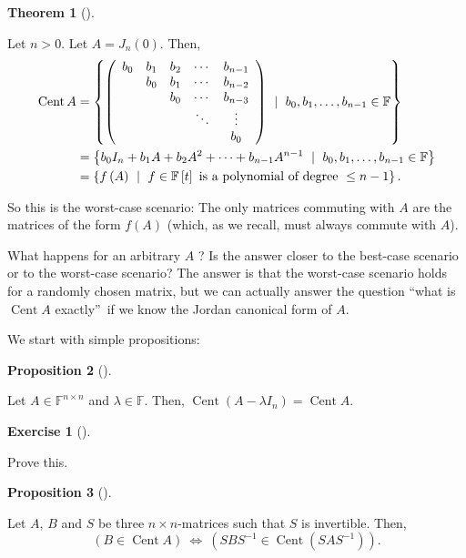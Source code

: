 \documentclass[numbers=enddot,12pt,final,onecolumn,notitlepage]{scrartcl}%
\newcounter{exer}
\numberwithin{exer}{subsection}
\theoremstyle{definition}
\newtheorem{theo}{Theorem}[subsection]
\newenvironment{theorem}[1][]
{\begin{theo}[#1]\begin{leftbar}}
{\end{leftbar}\end{theo}}
\newtheorem{prop}[theo]{Proposition}
\newenvironment{proposition}[1][]
{\begin{prop}[#1]\begin{leftbar}}
{\end{leftbar}\end{prop}}
\newtheorem{exmp}[exer]{Exercise}
\newenvironment{exercise}[1][]
{\begin{exmp}[#1]\begin{leftbar}}
{\end{leftbar}\end{exmp}}
\begin{document}
\begin{theorem}
Let $n>0$. Let $A=J_{n}\left(  0\right)  $. Then,
\begin{align*}
\operatorname*{Cent}A  &  =\left\{  \left(
\begin{array}
[c]{ccccc}%
b_{0} & b_{1} & b_{2} & \cdots & b_{n-1}\\
& b_{0} & b_{1} & \cdots & b_{n-2}\\
&  & b_{0} & \cdots & b_{n-3}\\
&  &  & \ddots & \vdots\\
&  &  &  & b_{0}%
\end{array}
\right)  \ \mid\ b_{0},b_{1},\ldots,b_{n-1}\in\mathbb{F}\right\} \\
&  =\left\{  b_{0}I_{n}+b_{1}A+b_{2}A^{2}+\cdots+b_{n-1}A^{n-1}\ \mid
\ b_{0},b_{1},\ldots,b_{n-1}\in\mathbb{F}\right\} \\
&  =\left\{  f\left(  A\right)  \ \mid\ f\in\mathbb{F}\left[  t\right]  \text{
is a polynomial of degree }\leq n-1\right\}  .
\end{align*}

\end{theorem}

So this is the worst-case scenario: The only matrices commuting with $A$ are
the matrices of the form $f\left(  A\right)  $ (which, as we recall, must
always commute with $A$).

What happens for an arbitrary $A$ ? Is the answer closer to the best-case
scenario or to the worst-case scenario? The answer is that the worst-case
scenario holds for a randomly chosen matrix, but we can actually answer the
question \textquotedblleft what is $\operatorname*{Cent}A$
exactly\textquotedblright\ if we know the Jordan canonical form of $A$.

We start with simple propositions:

\begin{proposition}
Let $A\in\mathbb{F}^{n\times n}$ and $\lambda\in\mathbb{F}$. Then,
$\operatorname*{Cent}\left(  A-\lambda I_{n}\right)  =\operatorname*{Cent}A$.
\end{proposition}

\begin{exercise}
 Prove this.
\end{exercise}

\begin{proposition}
Let $A$, $B$ and $S$ be three $n\times n$-matrices such that $S$ is
invertible. Then,
\[
\left(  B\in\operatorname*{Cent}A\right)  \ \Longleftrightarrow\ \left(
SBS^{-1}\in\operatorname*{Cent}\left(  SAS^{-1}\right)  \right)  .
\]

\end{proposition}
\end{document}
